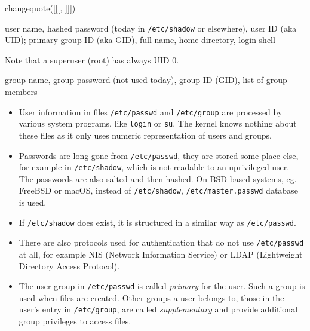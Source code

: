 
changequote([[[, ]]])

\pagebreak
{}

\begin{slide}
\end{slide}

\begin{slide}
\begin{center}
\end{center}
\vspace{2ex}

 user name, 
hashed password (today in \texttt{/etc/shadow} or elsewhere), user ID (aka UID);
primary group ID (aka GID), full name, home directory, login shell

Note that a superuser (root) has always UID 0.

\vspace{2ex}
\begin{center}
\end{center}
\vspace{2ex}

 group name, group password (not
used today), group ID (GID), list of group members
\end{slide}

\begin{itemize}
\item User information in files \texttt{/etc/passwd} and \texttt{/etc/group} are
processed by various system programs, like \texttt{login} or \texttt{su}.
The kernel knows nothing about these files as it only uses numeric
representation of users and groups.
\item Passwords are long gone from \texttt{/etc/passwd}, they are stored some
place else, for example in \texttt{/etc/shadow}, which is not readable to an
uprivileged user.  The passwords are also salted and then hashed.  On BSD based
systems, eg. FreeBSD or macOS, instead of \texttt{/etc/shadow},
\texttt{/etc/master.passwd} database is used.
\item If \texttt{/etc/shadow} does exist, it is structured in a similar way as
\texttt{/etc/passwd}.
\item There are also protocols used for authentication that do not use
\texttt{/etc/passwd} at all, for example NIS (Network Information Service) or
LDAP (Lightweight Directory Access Protocol).
\item The user group in \texttt{/etc/passwd} is called \emph{primary} for the
user.  Such a group is used when files are created.  Other groups a user belongs
to, those in the user's entry in \texttt{/etc/group}, are called
\emph{supplementary} and provide additional group privileges to access files.
\end{itemize}

